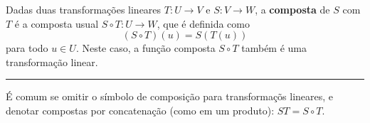 \begin{definition}
	Dadas duas transformações lineares $T\colon U\to V$ e $S\colon V\to W$, a \textbf{composta} de $S$ com $T$ é a composta usual $S\circ T\colon U\to W$, que é definida como
	\[(S\circ T)(u)=S(T(u))\]
	para todo $u\in U$. Neste caso, a função composta $S\circ T$ também é uma transformação linear.
	\hrule
	É comum se omitir o símbolo de composição para transformaçõs lineares, e denotar compostas por concatenação (como em um produto): $ST=S\circ T$.
\end{definition}